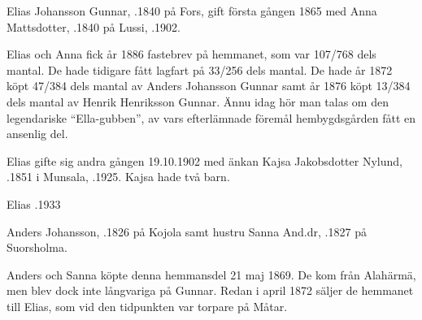 
Elias Johansson Gunnar, .1840 på Fors, gift första gången 1865 med Anna Mattsdotter, .1840 på Lussi, .1902.

\begin{jhchildren}
  \item {}
  \item {}
  \item {}
\end{jhchildren}

Elias och Anna fick år 1886 fastebrev på hemmanet, som var 107/768 dels mantal. De hade tidigare fått lagfart på 33/256 dels mantal. De hade år 1872 köpt 47/384 dels mantal av Anders Johansson Gunnar samt år 1876 köpt 13/384 dels mantal av Henrik Henriksson Gunnar. Ännu idag hör man talas om den legendariske ``Ella-gubben'', av vars efterlämnade föremål hembygdsgården fått en ansenlig del.

Elias gifte sig andra gången 19.10.1902 med änkan Kajsa Jakobsdotter Nylund, .1851 i Munsala, .1925. Kajsa hade två barn.

\begin{jhchildren}
  \item {}
  \item {}
\end{jhchildren}

Elias .1933


Anders Johansson, .1826 på Kojola samt hustru Sanna And.dr, .1827 på Suorsholma.

\begin{jhchildren}
  \item {}
  \item {}
  \item {}
\end{jhchildren}

Anders och Sanna köpte denna hemmansdel 21 maj 1869. De kom från Alahärmä, men blev dock inte långvariga på Gunnar. Redan i april 1872 säljer de hemmanet till Elias, som vid den tidpunkten var torpare på Måtar.



